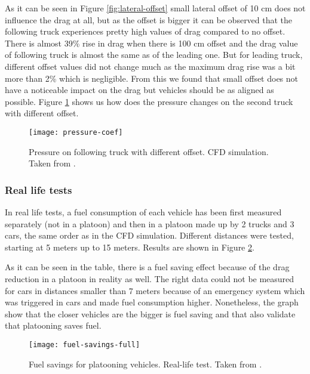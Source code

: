 % 
As it can be seen in Figure \ref{fig:lateral-offset} small lateral offset of 10 cm does not influence the drag at all, but as the offset is bigger it can be observed that the following truck experiences pretty high values of drag compared to no offset. There is almost 39\% rise in drag when there is 100 cm offset and the drag value of following truck is almost the same as of the leading one. But for leading truck, different offset values did not change much as the maximum drag rise was a bit more than 2\% which is negligible. From this we found that small offset does not have a noticeable impact on the drag but vehicles should be as aligned as possible. Figure \ref{fig:pressure-coef} shows us how does the pressure changes on the second truck with different offset.\par
%
\begin{figure}[p]
    \centering
    \texttt{[image: pressure-coef]}
    \caption{Pressure on following truck with different offset. \acrshort{CFD} simulation. Taken from \cite[p. 19]{Laxhammar2015CooperativeConsumption}.}
    \label{fig:pressure-coef}
\end{figure}
% 
% 
\subsubsection*{Real life tests}
In real life tests, a fuel consumption of each vehicle has been first measured separately (not in a platoon) and then in a platoon made up by 2 trucks and 3 cars, the same order as in the \acrshort{CFD} simulation. Different distances were tested, starting at 5 meters up to 15 meters. Results are shown in Figure \ref{fig:fuel-savings-full}.\par
% 
As it can be seen in the table, there is a fuel saving effect because of the drag reduction in a platoon in reality as well. The right data could not be measured for cars in distances smaller than 7 meters because of an emergency system which was triggered in cars and made fuel consumption higher. Nonetheless, the graph show that the closer vehicles are the bigger is fuel saving and that also validate that platooning saves fuel.
% 
\begin{figure}[h]
    \centering
    \texttt{[image: fuel-savings-full]}
    \caption{Fuel savings for platooning vehicles. Real-life test. Taken from \cite[p. 36]{Chan2012ProjectSARTRE}.}
    \label{fig:fuel-savings-full}
\end{figure}
% 
